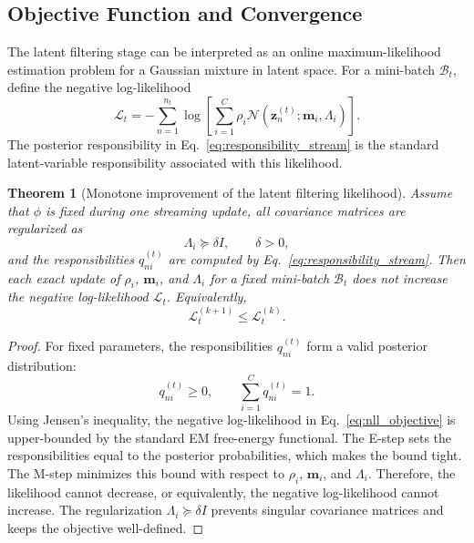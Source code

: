 \documentclass{article}
\theoremstyle{plain}
\newtheorem{theorem}{Theorem}
\theoremstyle{definition}
\theoremstyle{remark}
\begin{document}
\subsection{Objective Function and Convergence}
\label{subsec:objective_convergence}

The latent filtering stage can be interpreted as an online maximum-likelihood estimation problem for a Gaussian mixture in latent space. For a mini-batch \(\mathcal B_t\), define the negative log-likelihood
\begin{equation}
	\label{eq:nll_objective}
	\mathcal L_t
	=
	-
	\sum_{n=1}^{n_t}
	\log
	\left[
	\sum_{i=1}^{C}
	\rho_i
	\mathcal N(\mathbf z_n^{(t)};\mathbf m_i,\Lambda_i)
	\right].
\end{equation}
The posterior responsibility in Eq.~\eqref{eq:responsibility_stream} is the standard latent-variable responsibility associated with this likelihood.

\begin{theorem}[Monotone improvement of the latent filtering likelihood]
	\label{thm:monotone_likelihood}
	Assume that \(\phi\) is fixed during one streaming update, all covariance matrices are regularized as
	\[
	\Lambda_i\succeq\delta I,
	\qquad
	\delta>0,
	\]
	and the responsibilities \(q_{ni}^{(t)}\) are computed by Eq.~\eqref{eq:responsibility_stream}. Then each exact update of \(\rho_i\), \(\mathbf m_i\), and \(\Lambda_i\) for a fixed mini-batch \(\mathcal B_t\) does not increase the negative log-likelihood \(\mathcal L_t\). Equivalently,
	\[
	\mathcal L_t^{(k+1)}
	\leq
	\mathcal L_t^{(k)}.
	\]
\end{theorem}

\begin{proof}
	For fixed parameters, the responsibilities \(q_{ni}^{(t)}\) form a valid posterior distribution:
	\[
	q_{ni}^{(t)}\geq 0,
	\qquad
	\sum_{i=1}^{C}q_{ni}^{(t)}=1.
	\]
	Using Jensen's inequality, the negative log-likelihood in Eq.~\eqref{eq:nll_objective} is upper-bounded by the standard EM free-energy functional. The E-step sets the responsibilities equal to the posterior probabilities, which makes the bound tight. The M-step minimizes this bound with respect to \(\rho_i\), \(\mathbf m_i\), and \(\Lambda_i\). Therefore, the likelihood cannot decrease, or equivalently, the negative log-likelihood cannot increase. The regularization \(\Lambda_i\succeq\delta I\) prevents singular covariance matrices and keeps the objective well-defined.
\end{proof}
\end{document}
